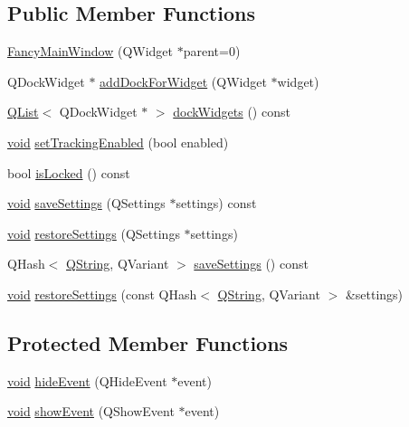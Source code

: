 \subsection*{Public Member Functions}
\begin{DoxyCompactItemize}
\item 
\hyperlink{class_utils_1_1_fancy_main_window_a168e128d3f13bbfaf7805d9cfb590bc2}{Fancy\-Main\-Window} (Q\-Widget $\ast$parent=0)
\item 
Q\-Dock\-Widget $\ast$ \hyperlink{class_utils_1_1_fancy_main_window_a421491059555a87ae2b5c395a4e54c0d}{add\-Dock\-For\-Widget} (Q\-Widget $\ast$widget)
\item 
\hyperlink{class_q_list}{Q\-List}$<$ Q\-Dock\-Widget $\ast$ $>$ \hyperlink{class_utils_1_1_fancy_main_window_aa36813c3a709ff0f7d2eb9a5da76bfd4}{dock\-Widgets} () const 
\item 
\hyperlink{group___u_a_v_objects_plugin_ga444cf2ff3f0ecbe028adce838d373f5c}{void} \hyperlink{class_utils_1_1_fancy_main_window_a2d8d324b8363730282ba40fecb8b9768}{set\-Tracking\-Enabled} (bool enabled)
\item 
bool \hyperlink{class_utils_1_1_fancy_main_window_ac239ffe161e74932b493aa55d23d8b62}{is\-Locked} () const 
\item 
\hyperlink{group___u_a_v_objects_plugin_ga444cf2ff3f0ecbe028adce838d373f5c}{void} \hyperlink{class_utils_1_1_fancy_main_window_ad7909fa8deee5dc4394554ca8acdab18}{save\-Settings} (Q\-Settings $\ast$settings) const 
\item 
\hyperlink{group___u_a_v_objects_plugin_ga444cf2ff3f0ecbe028adce838d373f5c}{void} \hyperlink{class_utils_1_1_fancy_main_window_a38517f30e5d3a541aa19eca0a15d1c8b}{restore\-Settings} (Q\-Settings $\ast$settings)
\item 
Q\-Hash$<$ \hyperlink{group___u_a_v_objects_plugin_gab9d252f49c333c94a72f97ce3105a32d}{Q\-String}, Q\-Variant $>$ \hyperlink{class_utils_1_1_fancy_main_window_ac5f53bf721cfaeb1339265d28c13a553}{save\-Settings} () const 
\item 
\hyperlink{group___u_a_v_objects_plugin_ga444cf2ff3f0ecbe028adce838d373f5c}{void} \hyperlink{class_utils_1_1_fancy_main_window_a91be3cb4a0f106a24def9f64f29917ef}{restore\-Settings} (const Q\-Hash$<$ \hyperlink{group___u_a_v_objects_plugin_gab9d252f49c333c94a72f97ce3105a32d}{Q\-String}, Q\-Variant $>$ \&settings)
\end{DoxyCompactItemize}
\subsection*{Protected Member Functions}
\begin{DoxyCompactItemize}
\item 
\hyperlink{group___u_a_v_objects_plugin_ga444cf2ff3f0ecbe028adce838d373f5c}{void} \hyperlink{class_utils_1_1_fancy_main_window_af75f017b9f6111029debafa47838a7a9}{hide\-Event} (Q\-Hide\-Event $\ast$event)
\item 
\hyperlink{group___u_a_v_objects_plugin_ga444cf2ff3f0ecbe028adce838d373f5c}{void} \hyperlink{class_utils_1_1_fancy_main_window_ae5574599bcaf697abc28fd98ad37def7}{show\-Event} (Q\-Show\-Event $\ast$event)
\end{DoxyCompactItemize}


